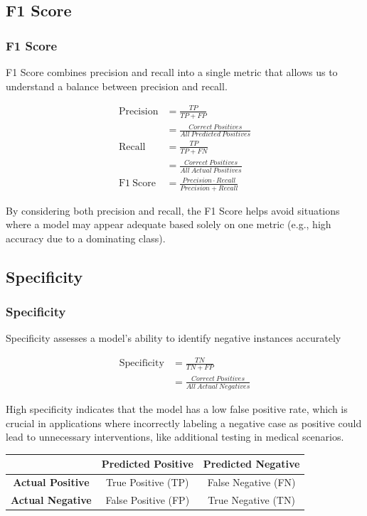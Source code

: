 \documentclass[aspectratio=169]{beamer} %
\begin{document}
	\subsection{F1 Score}
	\begin{frame}
		\frametitle{F1 Score}
		F1 Score combines precision and recall into a single metric that allows us to understand a balance between precision and recall.

		\begin{align*}
			\mathrm{Precision} &= \frac{TP}{TP+FP} \\
								&= \frac{Correct~Positives}{All~Predicted~Positives} \\
			\mathrm{Recall} &= \frac{TP}{TP+FN} \\
								&= \frac{Correct~Positives}{All~Actual~Positives} \\
			\mathrm{F1~Score} &= \frac{Precision \cdot Recall}{Precision + Recall}
		\end{align*}

		By considering both precision and recall, the F1 Score helps avoid situations where a model may appear adequate based solely on one metric (e.g., high accuracy due to a dominating class).

	\end{frame}

	\subsection{Specificity}
	\begin{frame}
		\frametitle{Specificity}
		Specificity assesses a model's ability to identify negative instances accurately

		\begin{align*}
			\mathrm{Specificity} &= \frac{TN}{TN+FP} \\
								&= \frac{Correct~Positives}{All~Actual~Negatives}
		\end{align*}

		High specificity indicates that the model has a low false positive rate, which is crucial in applications where incorrectly labeling a negative case as positive could lead to unnecessary interventions, like additional testing in medical scenarios.

		\begin{center}
			\begin{tabular}{|c|c|c|}
				\hline
				& \textbf{Predicted Positive} & \textbf{Predicted Negative} \\
				\hline
				\textbf{Actual Positive} & True Positive (TP) & False Negative (FN) \\
				\hline
				\textbf{Actual Negative} & False Positive (FP) & True Negative (TN) \\
				\hline
			\end{tabular}
		\end{center}
	\end{frame}
\end{document}
